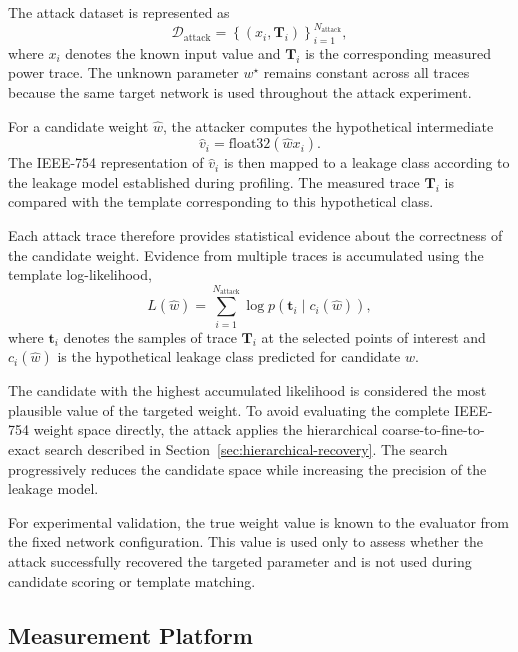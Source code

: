 \documentclass[conference]{IEEEtran}
\begin{document}
The attack dataset is represented as
\begin{equation*}
	\mathcal{D}_{\mathrm{attack}}
	=
	\left\{
	\left(
	x_i,
	\mathbf{T}_i
	\right)
	\right\}_{i=1}^{N_{\mathrm{attack}}},
\end{equation*}
where $x_i$ denotes the known input value and $\mathbf{T}_i$ is the corresponding measured power trace.
The unknown parameter $w^\star$ remains constant across all traces because the same target network is used throughout the attack experiment.

For a candidate weight $\hat{w}$, the attacker computes the hypothetical intermediate
\begin{equation*}
	\hat{v}_i
	=
	\mathrm{float32}(\hat{w}x_i).
\end{equation*}
The IEEE-754 representation of $\hat{v}_i$ is then mapped to a leakage class according to the leakage model established during profiling.
The measured trace $\mathbf{T}_i$ is compared with the template corresponding to this hypothetical class.

Each attack trace therefore provides statistical evidence about the correctness of the candidate weight.
Evidence from multiple traces is accumulated using the template log-likelihood,
\begin{equation*}
	L(\hat{w})
	=
	\sum_{i=1}^{N_{\mathrm{attack}}}
	\log
	p
	\left(
	\mathbf{t}_i
	\mid
	c_i(\hat{w})
	\right),
\end{equation*}
where $\mathbf{t}_i$ denotes the samples of trace $\mathbf{T}_i$ at the selected points of interest and $c_i(\hat{w})$ is the hypothetical leakage class predicted for candidate $\hat{w}$.

The candidate with the highest accumulated likelihood is considered the most plausible value of the targeted weight.
To avoid evaluating the complete IEEE-754 weight space directly, the attack applies the hierarchical coarse-to-fine-to-exact search described in Section~\ref{sec:hierarchical-recovery}.
The search progressively reduces the candidate space while increasing the precision of the leakage model.

For experimental validation, the true weight value is known to the evaluator from the fixed network configuration.
This value is used only to assess whether the attack successfully recovered the targeted parameter and is not used during candidate scoring or template matching.

\subsection{Measurement Platform}
\label{sec:measurement-platform}
\end{document}
